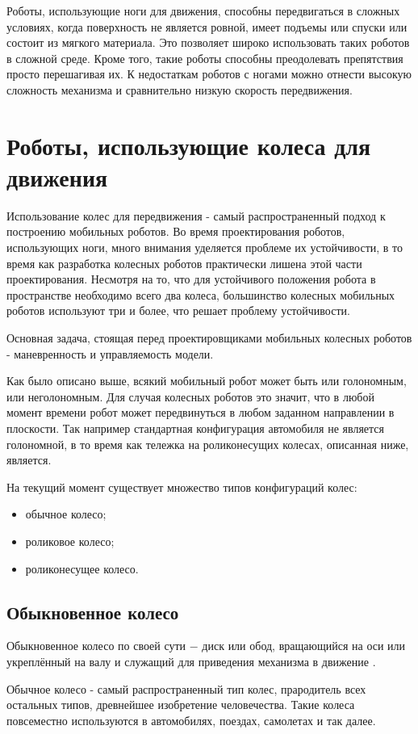 \documentclass[oneside,final,14pt]{extreport}
\begin{document}
Роботы, использующие ноги для движения, способны передвигаться в сложных условиях, когда поверхность не является ровной, имеет подъемы или спуски или состоит из мягкого материала. Это позволяет широко использовать таких роботов в сложной среде. Кроме того, такие роботы способны преодолевать препятствия просто перешагивая их. К недостаткам роботов с ногами можно отнести высокую сложность механизма и сравнительно низкую скорость передвижения.

\section{Роботы, использующие колеса для движения}
Использование колес для передвижения - самый распространенный подход к построению мобильных роботов. Во время проектирования роботов, использующих ноги, много внимания уделяется проблеме их устойчивости, в то время как разработка колесных роботов практически лишена этой части проектирования. Несмотря на то, что для устойчивого положения робота в пространстве необходимо всего два колеса, большинство колесных мобильных роботов используют три и более, что решает проблему устойчивости.

Основная задача, стоящая перед проектировщиками мобильных колесных роботов - маневренность и управляемость модели.

Как было описано выше, всякий мобильный робот может быть или голономным, или неголономным. Для случая колесных роботов это значит, что в любой момент времени робот может передвинуться в любом заданном направлении в плоскости. Так например стандартная конфигурация автомобиля не является голономной, в то время как тележка на роликонесущих колесах, описанная ниже, является.

На текущий момент существует множество типов конфигураций колес:
\begin{itemize}
\item обычное колесо;
\item роликовое колесо;
\item роликонесущее колесо.
\end{itemize}
\subsection{Обыкновенное колесо}
Обыкновенное колесо по своей сути $-$ диск или обод, вращающийся на оси или укреплённый на валу и служащий для приведения механизма в движение \cite{Ozhigov}.

Обычное колесо - самый распространенный тип колес, прародитель всех остальных типов, древнейшее изобретение человечества. Такие колеса повсеместно используются в автомобилях, поездах, самолетах и так далее. 
\end{document}
